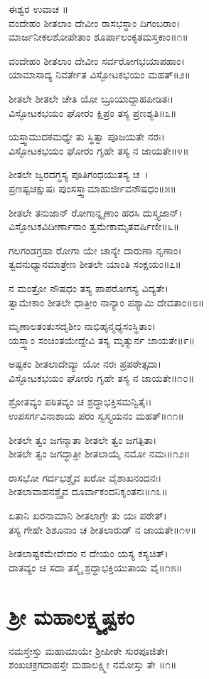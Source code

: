 ಈಶ್ವರ ಉವಾಚ ॥\\
ವಂದೇಹಂ ಶೀತಲಾಂ ದೇವೀಂ ರಾಸಭಸ್ಥಾಂ ದಿಗಂಬರಾಂ।\\
ಮಾರ್ಜನೀಕಲಶೋಪೇತಾಂ ಶೂರ್ಪಾಲಂಕೃತಮಸ್ತಕಾಂ॥೧॥

ವಂದೇಹಂ ಶೀತಲಾಂ ದೇವೀಂ ಸರ್ವರೋಗಭಯಾಪಹಾಂ।\\
ಯಾಮಾಸಾದ್ಯ ನಿವರ್ತೇತ ವಿಸ್ಫೋಟಕಭಯಂ ಮಹತ್॥೨॥

ಶೀತಲೇ ಶೀತಲೇ ಚೇತಿ ಯೋ ಬ್ರೂಯಾದ್ದಾಹಪೀಡಿತಃ।\\
ವಿಸ್ಫೋಟಕಭಯಂ ಘೋರಂ ಕ್ಷಿಪ್ರಂ ತಸ್ಯ ಪ್ರಣಶ್ಯತಿ॥೩॥

ಯಸ್ತ್ವಾಮುದಕಮಧ್ಯೇ ತು ಸ್ಥಿತ್ವಾ ಪೂಜಯತೇ ನರಃ।\\
ವಿಸ್ಫೋಟಕಭಯಂ ಘೋರಂ ಗೃಹೇ ತಸ್ಯ ನ ಜಾಯತೇ॥೪॥

ಶೀತಲೇ ಜ್ವರದಗ್ಧಸ್ಯ ಪೂತಿಗಂಧಯುತಸ್ಯ ಚ~।\\
ಪ್ರಣಷ್ಟಚಕ್ಷುಷಃ ಪುಂಸಸ್ತ್ವಾಮಾಹುರ್ಜೀವನೌಷಧಂ॥೫॥

ಶೀತಲೇ ತನುಜಾನ್ ರೋಗಾನ್ನೃಣಾಂ ಹರಸಿ ದುಸ್ತ್ಯಜಾನ್।\\
ವಿಸ್ಫೋಟಕವಿದೀರ್ಣಾನಾಂ ತ್ವಮೇಕಾಮೃತವರ್ಷಿಣೀ॥೬॥

ಗಲಗಂಡಗ್ರಹಾ ರೋಗಾ ಯೇ ಚಾನ್ಯೇ ದಾರುಣಾ ನೃಣಾಂ।\\
ತ್ವದನುಧ್ಯಾನಮಾತ್ರೇಣ ಶೀತಲೇ ಯಾಂತಿ ಸಂಕ್ಷಯಂ॥೭॥

ನ ಮಂತ್ರೋ ನೌಷಧಂ ತಸ್ಯ ಪಾಪರೋಗಸ್ಯ ವಿದ್ಯತೇ।\\
ತ್ವಾಮೇಕಾಂ ಶೀತಲೇ ಧಾತ್ರೀಂ ನಾನ್ಯಾಂ ಪಶ್ಯಾಮಿ ದೇವತಾಂ॥೮॥

ಮೃಣಾಲತಂತುಸದೃಶೀಂ ನಾಭಿಹೃನ್ಮಧ್ಯಸಂಸ್ಥಿತಾಂ।\\
ಯಸ್ತ್ವಾಂ ಸಂಚಿಂತಯೇದ್ದೇವಿ ತಸ್ಯ ಮೃತ್ಯುರ್ನ ಜಾಯತೇ॥೯॥

ಅಷ್ಟಕಂ ಶೀತಲಾದೇವ್ಯಾ ಯೋ ನರಃ ಪ್ರಪಠೇತ್ಸದಾ।\\
ವಿಸ್ಫೋಟಕಭಯಂ ಘೋರಂ ಗೃಹೇ ತಸ್ಯ ನ ಜಾಯತೇ॥೧೦॥

ಶ್ರೋತವ್ಯಂ ಪಠಿತವ್ಯಂ ಚ ಶ್ರದ್ಧಾಭಕ್ತಿಸಮನ್ವಿತೈಃ।\\
ಉಪಸರ್ಗವಿನಾಶಾಯ ಪರಂ ಸ್ವಸ್ತ್ಯಯನಂ ಮಹತ್॥೧೧॥

ಶೀತಲೇ ತ್ವಂ ಜಗನ್ಮಾತಾ ಶೀತಲೇ ತ್ವಂ ಜಗತ್ಪಿತಾ।\\
ಶೀತಲೇ ತ್ವಂ ಜಗದ್ಧಾತ್ರೀ ಶೀತಲಾಯೈ ನಮೋ ನಮಃ॥೧೨॥

ರಾಸಭೋ ಗರ್ದಭಶ್ಚೈವ ಖರೋ ವೈಶಾಖನಂದನಃ।\\
ಶೀತಲಾವಾಹನಶ್ಚೈವ ದೂರ್ವಾಕಂದನಿಕೃಂತನಃ॥೧೩॥

ಏತಾನಿ ಖರನಾಮಾನಿ ಶೀತಲಾಗ್ರೇ ತು ಯಃ ಪಠೇತ್।\\
ತಸ್ಯ ಗೇಹೇ ಶಿಶೂನಾಂ ಚ ಶೀತಲಾರುಡ್ ನ ಜಾಯತೇ॥೧೪॥

ಶೀತಲಾಷ್ಟಕಮೇವೇದಂ ನ ದೇಯಂ ಯಸ್ಯ ಕಸ್ಯಚಿತ್।\\
ದಾತವ್ಯಂ ಚ ಸದಾ ತಸ್ಮೈ ಶ್ರದ್ಧಾಭಕ್ತಿಯುತಾಯ ವೈ॥೧೫॥

\section{ ಶ್ರೀ ಮಹಾಲಕ್ಷ್ಮ್ಯಷ್ಟಕಂ}
ನಮಸ್ತೇಸ್ತು ಮಹಾಮಾಯೇ ಶ್ರೀಪೀಠೇ ಸುರಪೂಜಿತೇ।\\
ಶಂಖಚಕ್ರಗದಾಹಸ್ತೇ ಮಹಾಲಕ್ಷ್ಮೀ ನಮೋಸ್ತು ತೇ ॥೧॥

